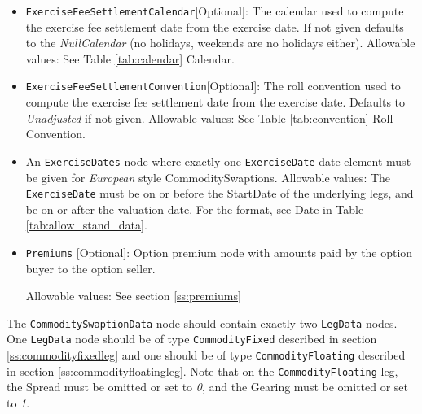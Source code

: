 \begin{itemize}
\item \lstinline!ExerciseFeeSettlementCalendar![Optional]: The calendar used to compute the exercise fee settlement date from the
  exercise date. If not given defaults to the \emph{NullCalendar} (no holidays, weekends are no holidays either). Allowable values: See Table \ref{tab:calendar} Calendar.

\item \lstinline!ExerciseFeeSettlementConvention![Optional]: The roll convention used to compute the exercise fee settlement date from
  the exercise date. Defaults to \emph{Unadjusted} if not given. Allowable values: See Table \ref{tab:convention} Roll Convention.

\item An \lstinline!ExerciseDates! node where exactly one \lstinline!ExerciseDate! date element must be given for \emph{European} style CommoditySwaptions. Allowable values: The \lstinline!ExerciseDate! must be on or before the StartDate of the underlying legs, and be on or after the valuation date. For the format, see Date in Table \ref{tab:allow_stand_data}. \\

\item \lstinline!Premiums! [Optional]: Option premium node with amounts paid by the option buyer to the option seller.

Allowable values:  See section \ref{ss:premiums}

\end{itemize}


The \lstinline!CommoditySwaptionData! node should contain exactly two \lstinline!LegData! nodes. One \lstinline!LegData! node should be of type \lstinline!CommodityFixed! described in section \ref{ss:commodityfixedleg} and one should be of type \lstinline!CommodityFloating! described in section \ref{ss:commodityfloatingleg}. Note that on the \lstinline!CommodityFloating! leg, the Spread must be omitted or set to \emph{0}, and the Gearing must be omitted or set to \emph{1}.

